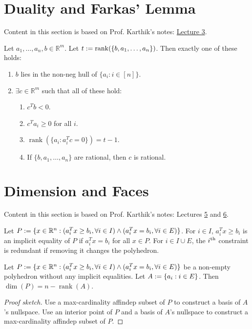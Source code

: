 \documentclass[a4paper, 12pt, fleqn]{article}
\newenvironment*{tightenum}{\begin{enumerate}[noitemsep]}{\end{enumerate}}
\DeclareMathOperator{\rank}{rank}
\newcommand*{\karthikLec}[1]{http://karthik.ise.illinois.edu/courses/ie511/lectures-sp-21/lecture-#1.pdf}
\begin{document}
\section{Duality and Farkas' Lemma}

Content in this section is based on Prof. Karthik's notes: \href{\karthikLec{3}}{Lecture 3}.

\begin{theorem}
Let $a_1, \ldots, a_n, b \in \mathbb{R}^m$. Let $t \defeq \rank(\{b, a_1, \ldots, a_n\})$.
Then exactly one of these holds:
\begin{tightenum}
\item $b$ lies in the non-neg hull of $\{a_i: i \in [n]\}$.
\item $\exists c \in \mathbb{R}^m$ such that all of these hold:
    \begin{tightenum}
    \item $c^Tb < 0$.
    \item $c^Ta_i \ge 0$ for all $i$.
    \item $\rank(\{a_i: a_i^Tc = 0\}) = t-1$.
    \item If $\{b, a_1, \ldots, a_n\}$ are rational, then $c$ is rational.
    \end{tightenum}
\end{tightenum}
\end{theorem}

\section{Dimension and Faces}

Content in this section is based on Prof. Karthik's notes:
Lectures \href{\karthikLec{5}}{5} and \href{\karthikLec{6}}{6}.

\begin{definition}
Let $P := \{x \in \mathbb{R}^n: (a_i^Tx \ge b_i, \forall i \in I) \wedge (a_i^Tx = b_i, \forall i \in E)\}$.
For $i \in I$, $a_i^Tx \ge b_i$ is an implicit equality of $P$ if $a_i^Tx = b_i$ for all $x \in P$.
For $i \in I \cup E$, the $i^{\textrm{th}}$ constraint is redundant if removing it changes the polyhedron.
\end{definition}

\begin{theorem}
\label{thm:dim-from-rank}
Let $P := \{x \in \mathbb{R}^n: (a_i^Tx \ge b_i, \forall i \in I) \wedge (a_i^Tx = b_i, \forall i \in E)\}$
be a non-empty polyhedron without any implicit equalities.
Let $A := \{a_i: i \in E\}$. Then $\dim(P) = n - \rank(A)$.
\end{theorem}
\begin{proof}[Proof sketch]
Use a max-cardinality affindep subset of $P$ to construct a basis of $A$'s nullspace.
Use an interior point of $P$ and a basis of $A$'s nullspace to construct
a max-cardinality affindep subset of $P$.
\end{proof}
\end{document}
